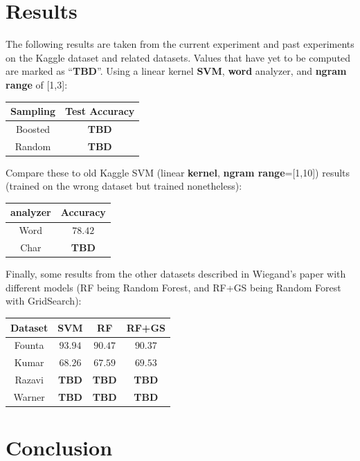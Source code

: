 \documentclass[11pt,a4paper]{article}
\begin{document}
\section{Results}
The following results are taken from the current experiment and past experiments on the Kaggle dataset and related datasets. Values that have yet to be computed are marked as ``\textbf{TBD}''.
\newpage
Using a linear kernel \textbf{SVM}, \textbf{word} analyzer, and \textbf{ngram range} of [1,3]:
\begin{center}
	\begin{tabular}{|c|c|}
		\hline
		\textbf{Sampling} & \textbf{Test Accuracy}\\
		\hline
		Boosted & \textbf{TBD}\\
		Random & \textbf{TBD}\\
		\hline
	\end{tabular}
\end{center}

Compare these to old Kaggle SVM (linear \textbf{kernel}, \textbf{ngram range}=[1,10]) results (trained on the wrong dataset but trained nonetheless):

\begin{center}
	\begin{tabular}{|c|c|}
		\hline
		\textbf{analyzer} & \textbf{Accuracy}\\
		\hline
		Word & $78.42$\\
		Char & \textbf{TBD}\\
		\hline
	\end{tabular}
\end{center}

Finally, some results from the other datasets described in Wiegand's paper with different models (RF being Random Forest, and RF+GS being Random Forest with GridSearch):
\begin{center}
	\begin{tabular}{|c|c|c|c|}
		\hline
		\textbf{Dataset} & \textbf{SVM} & \textbf{RF} & \textbf{RF+GS}\\
		\hline
		Founta & $93.94$ & $90.47$ & $90.37$\\
		Kumar & $68.26$ & $67.59$ & $69.53$\\
		Razavi & \textbf{TBD} & \textbf{TBD} &\textbf{TBD}\\
		Warner & \textbf{TBD} & \textbf{TBD} &\textbf{TBD}\\
		\hline
	\end{tabular}
\end{center}





\section{Conclusion}


%
%
%

\end{document}
